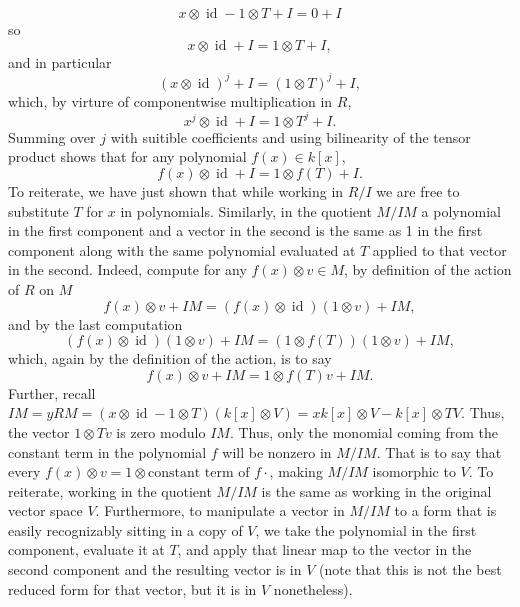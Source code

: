 \documentclass[18pt]{amsart}
\newcommand{\id}{\operatorname{id}}
\begin{document}
	\begin{equation*}
		x \otimes \id - 1 \otimes T +I = 0 +I
	\end{equation*}
so 
	\begin{equation*}
		x \otimes \id +I =1 \otimes T +I,
	\end{equation*}
and in particular
	\begin{equation*}
		(x \otimes \id)^j +I = (1 \otimes T)^j +I,
	\end{equation*}
which, by virture of componentwise multiplication in $R$, 
	\begin{equation*}
		x^j \otimes \id +I = 1 \otimes T^j +I.
	\end{equation*}
Summing over $j$ with suitible coefficients and using bilinearity of the tensor product shows that for any polynomial $f(x) \in k[x]$,
	\begin{equation*}
		f(x) \otimes \id +I = 1\otimes f(T) +I.
	\end{equation*}
To reiterate, we have just shown that while working in $R/I$ we are free to substitute $T$ for $x$ in polynomials.
	Similarly, in the quotient $M/IM$ a polynomial in the first component and a vector in the second is the same as 1 in the first component along with the same polynomial evaluated at $T$ applied to that vector in the second. Indeed, compute for any $f(x) \otimes v \in M$, by definition of the action of $R$ on $M$
	\begin{equation*}
		f(x) \otimes v +IM = (f(x) \otimes \id)(1 \otimes v) + IM,
	\end{equation*}
and by the last computation 
	\begin{equation*}
		(f(x) \otimes \id)(1 \otimes v) + IM=(1\otimes f(T))(1 \otimes v) + IM,
	\end{equation*}
which, again by the definition of the action, is to say
	\begin{equation*}
		f(x) \otimes v +IM = 1\otimes f(T)v +IM.
	\end{equation*}
Further, recall $IM=yRM=(x\otimes \id - 1 \otimes T)(k[x]\otimes V)=xk[x]\otimes V -k[x]\otimes TV$. Thus, the vector $1\otimes Tv$  is zero modulo $IM$. Thus, only the monomial coming from the constant term in the polynomial $f$ will be nonzero in $M/IM$. That is to say that every $f(x) \otimes v = 1 \otimes \text{constant term of } f \cdot $, making $M/IM$ isomorphic to $V$. To reiterate, working in the quotient $M/IM$ is the same as working in the original vector space $V$. Furthermore, to manipulate a vector in  $M/IM$ to a form that is easily recognizably sitting in a copy of $V$, we take the polynomial in the first component, evaluate it at $T$, and apply that linear map to the vector in the second component and the resulting vector is in $V$ (note that this is not the best reduced form for that vector, but it is in $V$ nonetheless).
\end{document}
